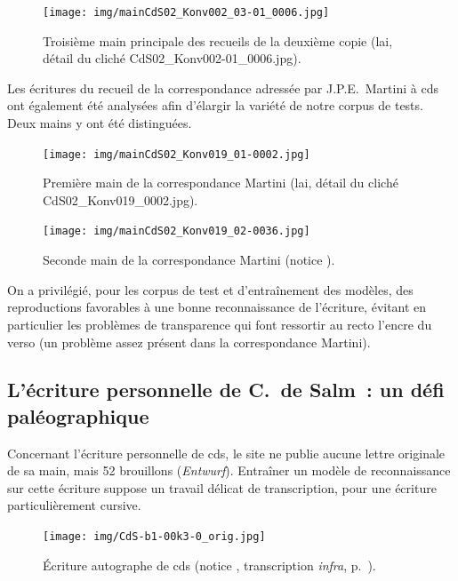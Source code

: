 \documentclass[a4paper,12pt,twoside]{book}
\begin{document}
				\begin{figure}[!h]
					\centering
					\texttt{[image: img/mainCdS02\_Konv002\_03-01\_0006.jpg]}
					\caption{Troisième main principale des recueils de la deuxième copie  (\gls{lai}, détail du cliché CdS02\_Konv002-01\_0006.jpg).}
					\label{}
				\end{figure}
					
				Les écritures du recueil de la correspondance adressée par J.P.E.~Martini à \gls{cds} ont également été analysées afin d'élargir la variété de notre corpus de tests. Deux mains y ont été distinguées.
				
				\begin{figure}[!h]
					\centering
					\texttt{[image: img/mainCdS02\_Konv019\_01-0002.jpg]}
					\caption{Première main de la correspondance Martini (\gls{lai}, détail du cliché CdS02\_Konv019\_0002.jpg).}
					\label{}
				\end{figure}
				
				\begin{figure}[!h]
					\centering
					\texttt{[image: img/mainCdS02\_Konv019\_02-0036.jpg]}
					\caption{Seconde main de la correspondance Martini (notice \cite{CdS19036037}).}
					\label{}
				\end{figure}
					
				On a privilégié, pour les corpus de test et d'entraînement des modèles, des reproductions favorables à une bonne reconnaissance de l'écriture, évitant en particulier les problèmes de transparence qui font ressortir au recto l'encre du verso (un problème assez présent dans la correspondance Martini).

			\subsection{L'écriture personnelle de C.~de Salm~: un défi paléographique}
				Concernant l'écriture personnelle de \gls{cds}, le site ne publie aucune lettre originale de sa main, mais 52 brouillons (\textit{Entwurf}). Entraîner un modèle de reconnaissance sur cette écriture suppose un travail délicat de transcription, pour une écriture particulièrement cursive.
				
				\begin{figure}[!h]
					\centering
					\texttt{[image: img/CdS-b1-00k3-0\_orig.jpg]}
					\caption{Écriture autographe de \gls{cds} (notice \cite{C11S92047049}, transcription \textit{infra}, p.~\pageref{trans-C11S92047049}).}
					\label{}
				\end{figure}
				
\end{document}
